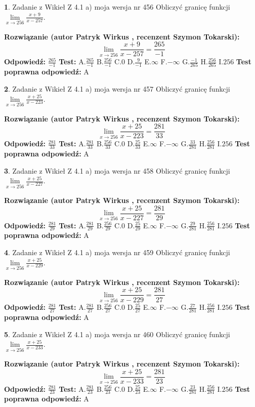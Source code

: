 \documentclass[12pt, a4paper]{article}
\theoremstyle{definition} %
\newtheorem{zad}{}
\newcommand{\zadStart}[1]{\begin{zad}#1\newline}
\newcommand{\zadStop}{\end{zad}}
\newcommand{\rozwStart}[2]{\noindent \textbf{Rozwiązanie (autor #1 , recenzent #2): }\newline}
\newcommand{\rozwStop}{\newline}
\newcommand{\odpStart}{\noindent \textbf{Odpowiedź:}\newline}
\newcommand{\odpStop}{\newline}
\newcommand{\testStart}{\noindent \textbf{Test:}\newline}
\newcommand{\testStop}{\newline}
\newcommand{\kluczStart}{\noindent \textbf{Test poprawna odpowiedź:}\newline}
\newcommand{\kluczStop}{\newline}
\begin{document}
\zadStart{Zadanie z Wikieł Z 4.1 a) moja wersja nr 456}
Obliczyć granicę funkcji $\lim\limits_{x\to256}\frac{x+9}{x-257}$.
\zadStop
\rozwStart{Patryk Wirkus}{Szymon Tokarski}
$$\lim\limits_{x\to256}\frac{x+9}{x-257} = \frac{265}{-1}$$
\rozwStop
\odpStart
$\frac{265}{-1}$
\odpStop
\testStart
A.$\frac{265}{-1}$
B.$\frac{256}{-1}$
C.$0$
D.$\frac{9}{-1}$
E.$\infty$
F.$-\infty$
G.$\frac{-1}{265}$
H.$\frac{256}{265}$
I.$256$
\testStop
\kluczStart
A
\kluczStop



\zadStart{Zadanie z Wikieł Z 4.1 a) moja wersja nr 457}
Obliczyć granicę funkcji $\lim\limits_{x\to256}\frac{x+25}{x-223}$.
\zadStop
\rozwStart{Patryk Wirkus}{Szymon Tokarski}
$$\lim\limits_{x\to256}\frac{x+25}{x-223} = \frac{281}{33}$$
\rozwStop
\odpStart
$\frac{281}{33}$
\odpStop
\testStart
A.$\frac{281}{33}$
B.$\frac{256}{33}$
C.$0$
D.$\frac{25}{33}$
E.$\infty$
F.$-\infty$
G.$\frac{33}{281}$
H.$\frac{256}{281}$
I.$256$
\testStop
\kluczStart
A
\kluczStop



\zadStart{Zadanie z Wikieł Z 4.1 a) moja wersja nr 458}
Obliczyć granicę funkcji $\lim\limits_{x\to256}\frac{x+25}{x-227}$.
\zadStop
\rozwStart{Patryk Wirkus}{Szymon Tokarski}
$$\lim\limits_{x\to256}\frac{x+25}{x-227} = \frac{281}{29}$$
\rozwStop
\odpStart
$\frac{281}{29}$
\odpStop
\testStart
A.$\frac{281}{29}$
B.$\frac{256}{29}$
C.$0$
D.$\frac{25}{29}$
E.$\infty$
F.$-\infty$
G.$\frac{29}{281}$
H.$\frac{256}{281}$
I.$256$
\testStop
\kluczStart
A
\kluczStop



\zadStart{Zadanie z Wikieł Z 4.1 a) moja wersja nr 459}
Obliczyć granicę funkcji $\lim\limits_{x\to256}\frac{x+25}{x-229}$.
\zadStop
\rozwStart{Patryk Wirkus}{Szymon Tokarski}
$$\lim\limits_{x\to256}\frac{x+25}{x-229} = \frac{281}{27}$$
\rozwStop
\odpStart
$\frac{281}{27}$
\odpStop
\testStart
A.$\frac{281}{27}$
B.$\frac{256}{27}$
C.$0$
D.$\frac{25}{27}$
E.$\infty$
F.$-\infty$
G.$\frac{27}{281}$
H.$\frac{256}{281}$
I.$256$
\testStop
\kluczStart
A
\kluczStop



\zadStart{Zadanie z Wikieł Z 4.1 a) moja wersja nr 460}
Obliczyć granicę funkcji $\lim\limits_{x\to256}\frac{x+25}{x-233}$.
\zadStop
\rozwStart{Patryk Wirkus}{Szymon Tokarski}
$$\lim\limits_{x\to256}\frac{x+25}{x-233} = \frac{281}{23}$$
\rozwStop
\odpStart
$\frac{281}{23}$
\odpStop
\testStart
A.$\frac{281}{23}$
B.$\frac{256}{23}$
C.$0$
D.$\frac{25}{23}$
E.$\infty$
F.$-\infty$
G.$\frac{23}{281}$
H.$\frac{256}{281}$
I.$256$
\testStop
\kluczStart
A
\kluczStop
\end{document}
